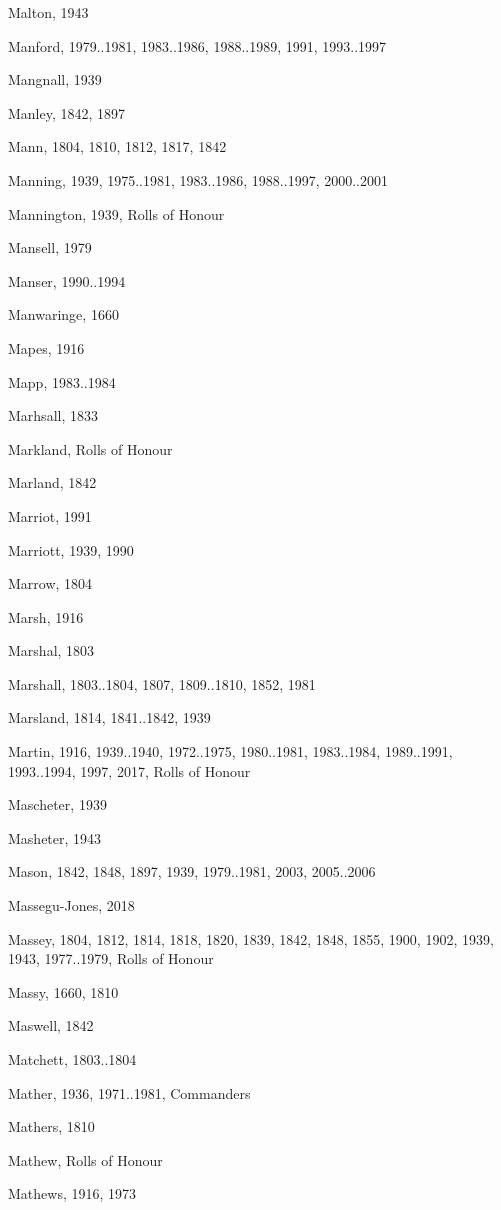 \begin{theindex}
\item Malton, 1943
\item Manford, 1979..1981, 1983..1986, 1988..1989, 1991, 1993..1997
\item Mangnall, 1939
\item Manley, 1842, 1897
\item Mann, 1804, 1810, 1812, 1817, 1842
\item Manning, 1939, 1975..1981, 1983..1986, 1988..1997, 2000..2001
\item Mannington, 1939, Rolls of Honour
\item Mansell, 1979
\item Manser, 1990..1994
\item Manwaringe, 1660
\item Mapes, 1916
\item Mapp, 1983..1984
\item Marhsall, 1833
\item Markland, Rolls of Honour
\item Marland, 1842
\item Marriot, 1991
\item Marriott, 1939, 1990
\item Marrow, 1804
\item Marsh, 1916
\item Marshal, 1803
\item Marshall, 1803..1804, 1807, 1809..1810, 1852, 1981
\item Marsland, 1814, 1841..1842, 1939
\item Martin, 1916, 1939..1940, 1972..1975, 1980..1981, 1983..1984, 1989..1991, 1993..1994, 1997, 2017, Rolls of Honour
\item Mascheter, 1939
\item Masheter, 1943
\item Mason, 1842, 1848, 1897, 1939, 1979..1981, 2003, 2005..2006
\item Massegu-Jones, 2018
\item Massey, 1804, 1812, 1814, 1818, 1820, 1839, 1842, 1848, 1855, 1900, 1902, 1939, 1943, 1977..1979, Rolls of Honour
\item Massy, 1660, 1810
\item Maswell, 1842
\item Matchett, 1803..1804
\item Mather, 1936, 1971..1981, Commanders
\item Mathers, 1810
\item Mathew, Rolls of Honour
\item Mathews, 1916, 1973

\end{theindex}
